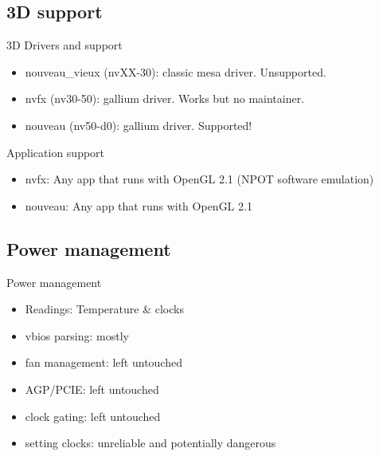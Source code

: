 \documentclass[11pt,english,compress]{beamer}
\begin{document}
	\subsection{3D support}
		\begin{frame}
			\begin{block}{3D Drivers and support}
				\begin{itemize}
					\item nouveau\_vieux (nvXX-30): classic mesa driver. Unsupported.
					\item nvfx (nv30-50): gallium driver. Works but no maintainer.
					\item nouveau (nv50-d0): gallium driver. Supported! 
				\end{itemize}
			\end{block}

	
			\begin{block}{Application support}
				\begin{itemize}
					\item nvfx: Any app that runs with OpenGL 2.1 (NPOT software emulation)
					\item nouveau: Any app that runs with OpenGL 2.1
				\end{itemize}
			\end{block}
		\end{frame}

	\subsection{Power management}
		\begin{frame}
			\begin{block}{Power management}
 				\begin{itemize}
					\item Readings: Temperature \& clocks
					\item vbios parsing: mostly
					\item fan management: left untouched
					\item AGP/PCIE: left untouched
					\item clock gating: left untouched
					\item setting clocks: unreliable and potentially dangerous
				\end{itemize}
			\end{block}
		\end{frame}
\end{document}
